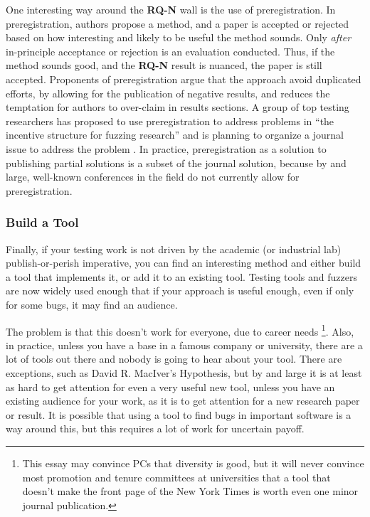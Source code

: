 \documentclass[sigplan]{acmart}
\begin{document}
One interesting way around the {\bf RQ-N} wall is the use of
preregistration.  In preregistration, authors propose a method, and
a paper is accepted or rejected based on how interesting and likely to
be useful the method sounds.  Only \emph{after} in-principle
acceptance or rejection is an evaluation conducted.  Thus, if the
method sounds good, and the {\bf RQ-N} result is nuanced, the paper is
still accepted.  Proponents of preregistration argue that the approach
avoid duplicated efforts, by allowing for the publication of negative
results, and reduces the temptation for authors to over-claim in
results sections.  A group of top testing researchers has proposed to
use preregistration to address problems in ``the incentive structure
for fuzzing research'' and is planning to organize a journal issue to
address the problem \cite{special}.  In practice, preregistration as a solution to
publishing partial solutions is a subset of the journal solution,
because by and large, well-known conferences in the field do not currently allow
for preregistration.


\subsubsection{Build a Tool}

Finally, if your testing work is not driven by the academic (or
industrial lab) publish-or-perish imperative, you can find an
interesting method and either build a tool that implements it, or add
it to an existing tool.  Testing tools and fuzzers are now widely used
enough that if your approach is useful enough, even if only for some
bugs, it may find an audience.

The problem is that this doesn't work for everyone, due to career
needs \footnote{This essay may convince PCs that diversity is good,
  but it will never convince most promotion and tenure committees at
  universities that a tool that doesn't make the front page of the New
  York Times is worth even one minor journal publication.}.  Also, in practice,
unless you have a base in a famous company or university, there are a
lot of tools out there and nobody is going to hear about your tool.
There are exceptions, such as David R. MacIver's Hypothesis, but by
and large it is at least as hard to get attention for even a very
useful new tool, unless you have an existing audience for your work,
as it is to get attention for a new research paper or result.  It is
possible that using a tool to find bugs in important software is a way
around this, but this requires a lot of work for uncertain payoff.
\end{document}
